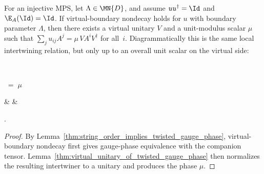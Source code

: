 \begin{lemma}%
    \label{thm:virtual_unitary_of_string_order}
    \leanok
    For an injective MPS, let $\Lambda \in \MN{D}$, and assume
    $u u^\dagger = \Id$ and $\E_A(\Id)=\Id$.
    If virtual-boundary nondecay holds for $u$ with boundary parameter
    $\Lambda$, then there exists a virtual unitary $V$ and a unit-modulus
    scalar $\mu$ such that
    $\sum_j u_{ij} A^j = \mu\, V A^i V^\dagger$ for all~$i$.
    Diagrammatically this is the same local intertwining relation,
    but only up to an overall unit scalar on the virtual side:
    \begin{tenkzequation}
        \tenkzkernel
        \begin{tenkz}[rows={op,ket}, cols=1]
             \\
        \end{tenkz}
        $\;=\;\mu\,$
        \begin{tenkz}[boundary=open]
             &  &
        \end{tenkz}.
    \end{tenkzequation}
\end{lemma}

\begin{proof}
    \leanok
    By Lemma~\ref{thm:string_order_implies_twisted_gauge_phase},
    virtual-boundary nondecay first gives gauge-phase equivalence with the
    companion tensor.
    Lemma~\ref{thm:virtual_unitary_of_twisted_gauge_phase} then normalizes the
    resulting intertwiner to a unitary and produces the phase $\mu$.
\end{proof}













